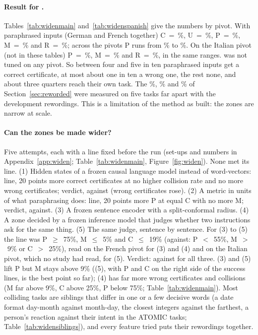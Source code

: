 \paragraph{Result for \cert{}.} Tables~\ref{tab:widenmain} and~\ref{tab:widenspanish} give the numbers by pivot. With \WidenParaInputs{} paraphrased inputs (German and French together) \textsf{C}~=~\WidenRefTfiveC{}\%, \textsf{U}~=~\WidenRefTfiveU{}\%, \textsf{P}~=~\WidenRefTfiveP{}\%, \textsf{M}~=~\WidenRefTfiveM{}\% and \textsf{R}~=~\WidenRefTfiveR{}\%; across the pivots \textsf{P} runs from \WidenRefTfivePLow{}\% to \WidenRefTfivePHigh{}\%. On the Italian pivot (not in these tables) \textsf{P}~=~\WidenRefTfiveItP{}\%, \textsf{M}~=~\WidenRefTfiveItM{}\% and \textsf{R}~=~\WidenRefTfiveItR{}\%, in the same ranges. \cert{} was not tuned on any pivot. So between four and five in ten paraphrased inputs get a correct certificate, at most about one in ten a wrong one, the rest none, and about three quarters reach their own task. The \FiveCertRightLight{}\%, \FiveCertRightMedium{}\% and \FiveCertRightHeavy{}\% of Section~\ref{sec:reworded} were measured on five tasks far apart with the development rewordings. This is a limitation of the method as built: the zones are narrow at scale.

\paragraph{Can the zones be made wider?} Five attempts, each with a line fixed before the run (set-ups and numbers in Appendix~\ref{app:widen}; Table~\ref{tab:widenmain}, Figure~\ref{fig:widen}). None met its line.
(1) Hidden states of a frozen causal language model instead of word-vectors: line, 20 points more correct certificates at no higher collision rate and no more wrong certificates; verdict, against (wrong certificates rose).
(2) A metric in units of what paraphrasing does: line, 20 points more \textsf{P} at equal \textsf{C} with no more \textsf{M}; verdict, against.
(3) A frozen sentence encoder \citep{reimers2019sbert,wang2020minilm} with a split-conformal radius.
(4) A zone decided by a frozen inference model \citep{he2023debertav3} that judges whether two instructions ask for the same thing.
(5) The same judge, sentence by sentence.
For (3) to (5) the line was \textsf{P}~$\ge$~75\%, \textsf{M}~$\le$~5\% and \textsf{C}~$\le$~19\% (against: \textsf{P}~$<$~55\%, \textsf{M}~$>$~9\% or \textsf{C}~$>$~25\%), read on the French pivot for (3) and (4) and on the Italian pivot, which no study had read, for (5). Verdict: against for all three. (3) and (5) lift \textsf{P} but \textsf{M} stays above 9\% ((5), with \textsf{P} and \textsf{C} on the right side of the success lines, is the best point so far); (4) has far more wrong certificates and collisions (\textsf{M} far above 9\%, \textsf{C} above 25\%, \textsf{P} below 75\%; Table~\ref{tab:widenmain}). Most colliding tasks are siblings that differ in one or a few decisive words (a date format day-month against month-day, the closest integers against the farthest, a person's reaction against their intent in the ATOMIC tasks; Table~\ref{tab:widensiblings}), and every feature tried puts their rewordings together.

